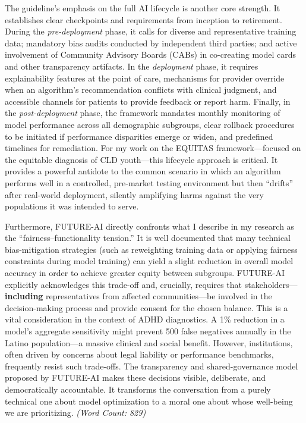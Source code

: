 \documentclass[11pt,twoside]{article}
\begin{document}
The guideline’s emphasis on the full AI lifecycle is another core strength. It establishes clear checkpoints and requirements from inception to retirement. During the \textit{pre-deployment} phase, it calls for diverse and representative training data; mandatory bias audits conducted by independent third parties; and active involvement of Community Advisory Boards (CABs) in co-creating model cards and other transparency artifacts. In the \textit{deployment} phase, it requires explainability features at the point of care, mechanisms for provider override when an algorithm’s recommendation conflicts with clinical judgment, and accessible channels for patients to provide feedback or report harm. Finally, in the \textit{post-deployment} phase, the framework mandates monthly monitoring of model performance across all demographic subgroups, clear rollback procedures to be initiated if performance disparities emerge or widen, and predefined timelines for remediation. For my work on the \textsc{EQUITAS} framework—focused on the equitable diagnosis of CLD youth—this lifecycle approach is critical. It provides a powerful antidote to the common scenario in which an algorithm performs well in a controlled, pre-market testing environment but then “drifts” after real-world deployment, silently amplifying harms against the very populations it was intended to serve.

Furthermore, FUTURE-AI directly confronts what I describe in my research as the “fairness–functionality tension.” It is well documented that many technical bias-mitigation strategies (such as reweighting training data or applying fairness constraints during model training) can yield a slight reduction in overall model accuracy in order to achieve greater equity between subgroups. FUTURE-AI explicitly acknowledges this trade-off and, crucially, requires that stakeholders—\textbf{including} representatives from affected communities—be involved in the decision-making process and provide consent for the chosen balance. This is a vital consideration in the context of ADHD diagnostics. A 1\% reduction in a model’s aggregate sensitivity might prevent 500 false negatives annually in the Latino population—a massive clinical and social benefit. However, institutions, often driven by concerns about legal liability or performance benchmarks, frequently resist such trade-offs. The transparency and shared-governance model proposed by FUTURE-AI makes these decisions visible, deliberate, and democratically accountable. It transforms the conversation from a purely technical one about model optimization to a moral one about whose well-being we are prioritizing. \textit{(Word Count: 829)}
\end{document}
